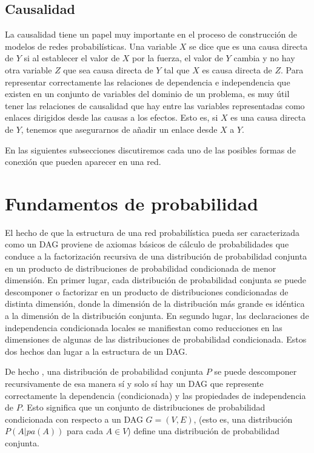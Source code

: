 \subsection{Causalidad}
La causalidad tiene un papel muy importante en el proceso de construcción de modelos de redes 
probabilísticas. Una variable $X$ se dice que es una causa directa de $Y$ si al establecer el valor 
de $X$ por la fuerza, el valor de $Y$ cambia y no hay otra variable $Z$ que sea causa directa de 
$Y$ tal que $X$ es causa directa de $Z$. Para representar correctamente las relaciones de dependencia 
e independencia que existen en un conjunto de variables 
del dominio de un problema, es muy útil tener las relaciones de causalidad que hay entre las variables 
representadas como enlaces dirigidos desde las causas 
a los efectos. Esto es, si $X$ es una causa directa de $Y$, tenemos que asegurarnos de añadir un enlace 
desde $X$ a $Y$. 

En las siguientes subsecciones discutiremos cada uno de las posibles formas de conexión que pueden 
aparecer en una red.

\section{Fundamentos de probabilidad} 
El hecho de que la estructura de una red probabilística pueda ser caracterizada como un DAG proviene de axiomas básicos 
de cálculo de probabilidades que conduce a la factorización recursiva de una distribución de probabilidad conjunta en 
un producto de distribuciones de probabilidad condicionada de menor dimensión. En primer lugar, cada distribución de 
probabilidad conjunta se puede descomponer o factorizar en un producto de distribuciones condicionadas de distinta 
dimensión, donde la dimensión de la distribución más grande es idéntica a la dimensión de la distribución conjunta. En 
segundo lugar, las declaraciones de independencia condicionada locales se manifiestan como reducciones en las dimensiones 
de algunas de las distribuciones de probabilidad condicionada. Estos dos hechos dan lugar a la estructura de un DAG.

De hecho , una distribución de probabilidad conjunta $P$ se puede descomponer recursivamente de esa manera sí y solo sí 
hay un DAG que represente correctamente la dependencia (condicionada) y las propiedades de independencia de $P$. Esto 
significa que un conjunto de distribuciones de probabilidad condicionada con respecto a un DAG $G=(V,E)$, (esto es, 
una distribución $P(A|pa(A))$ para cada $A \in V$) define una distribución de probabilidad conjunta.

